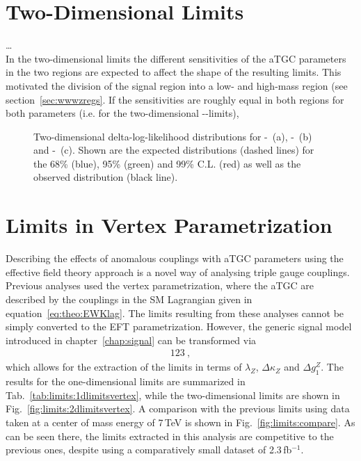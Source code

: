 \section{Two-Dimensional Limits}
\label{sec:2dlims}
\dots \\
\noindent In the two-dimensional limits the different sensitivities of the aTGC parameters in the two regions are expected to affect the shape of the resulting limits. This motivated the division of the signal region into a low- and high-mass region (see section~\ref{sec:wwwzregs}. If the sensitivities are roughly equal in both regions for both parameters (i.e. for the two-dimensional \Tcwww -\Tccw -limits), 

\begin{figure}
	\centering
	\caption[Two-dimensional delta-log-likelihood distributions for the three combinations of aTGC parameters]{Two-dimensional delta-log-likelihood distributions for \Tcwww -\Tccw \ (a), \Tcwww -\Tcb \ (b) and \Tccw -\Tcb\ (c). Shown are the expected distributions (dashed lines) for the 68\% (blue), 95\% (green) and 99\% C.L. (red) as well as the observed distribution (black line).}
	\label{fig:limits:2dlimits}	
\end{figure}

\section{Limits in Vertex Parametrization}
\label{sec:vertex}
Describing the effects of anomalous couplings with aTGC parameters using the effective field theory approach is a novel way of analysing triple gauge couplings. Previous analyses used the vertex parametrization, where the aTGC are described by the couplings in the SM Lagrangian given in equation~\ref{eq:theo:EWKlag}. The limits resulting from these analyses cannot be simply converted to the EFT parametrization. However, the generic signal model introduced in chapter~\ref{chap:signal} can be transformed via
\begin{align}
123~,
\end{align}
which allows for the extraction of the limits in terms of $\lambda_Z$, $\Delta \kappa_Z$ and $\Delta g_1^Z$. The results for the one-dimensional limits are summarized in Tab.~\ref{tab:limits:1dlimitsvertex}, while the two-dimensional limits are shown in Fig.~\ref{fig:limits:2dlimitsvertex}. A comparison with the previous limits using data taken at a center of mass energy of 7\,TeV is shown in Fig.~\ref{fig:limits:compare}. As can be seen there, the limits extracted in this analysis are competitive to the previous ones, despite using a comparatively small dataset of 2.3\,fb$^{-1}$.

